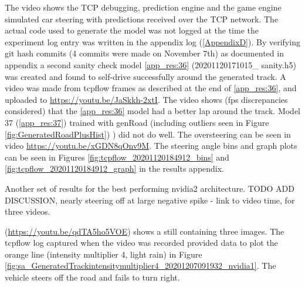 The video shows the TCP debugging, prediction engine and the game engine simulated car steering with predictions received over the TCP network. The actual code used to generate the model was not logged at the time the experiment log entry was written in the appendix log (\ref{AppendixD}). By verifying git hash commits (4 commits were made on November 7th) as documented in appendix  a second sanity check model \ref{app_res:36} (20201120171015\_ sanity.h5) was created and found to self-drive successfully around the generated track. A video was made from tcpflow frames as described at the end of \ref{app_res:36}, and uploaded to \href{https://youtu.be/JaSkkh-2xtI}{https://youtu.be/JaSkkh-2xtI}.
The video shows (fps discrepancies considered) that the \ref{app_res:36} model had a better lap around the track.
Model 37 (\ref{app_res:37}) trained with genRoad (including outliers seen in Figure \ref{fig:GeneratedRoadPlusHist}) ) did not do well. The oversteering can be seen in video \href{https://youtu.be/xGDN8qOnv9M}{https://youtu.be/xGDN8qOnv9M}. The steering angle bins and graph plots can be seen in  Figures \ref{fig:tcpflow_20201120184912_bins}  and \ref{fig:tcpflow_20201120184912_graph} in the results appendix.




Another set of results for the best performing nvidia2 architecture. TODO ADD DISCUSSION, nearly steering off at large negative spike - link to video time, for three videos.  

(\url{https://youtu.be/qdTA5ho5VOE}) shows a still containing three images. The tcpflow log captured when the video was recorded provided data to plot the orange line (intensity multiplier 4, light rain) in Figure \ref{fig:sa_GeneratedTrackintensitymultiplier4_20201207091932_nvidia1}. The vehicle steers off the road and fails to turn right.


